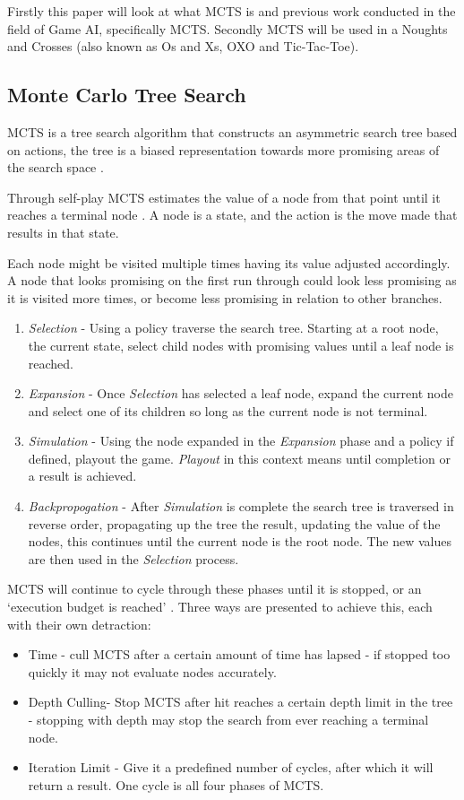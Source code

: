 \documentclass[conference]{IEEEtran}
\begin{document}
Firstly this paper will look at what MCTS is and previous work conducted in the field of Game AI, specifically MCTS. Secondly MCTS will be used in a Noughts and Crosses (also known as Os and Xs, OXO and Tic-Tac-Toe).

\subsection{Monte Carlo Tree Search}
MCTS is a tree search algorithm that constructs an asymmetric search tree based on actions, the tree is a biased representation towards more promising areas of the search space \cite{b5}.

Through self-play MCTS estimates the value of a node from that point until it reaches a terminal node \cite{b5}. A node is a state, and the action is the move made that results in that state.  

Each node might be visited multiple times having its value adjusted accordingly. A node that looks promising on the first run through could look less promising as it is visited more times, or become less promising in relation to other branches. 

\begin{enumerate}
  \item {\em Selection} - Using a policy traverse the search tree. Starting at a root node, the current state, select child nodes with promising values until a leaf node is reached.
  \item {\em Expansion} - Once {\em Selection} has selected a leaf node, expand the current node and select one of its children so long as the current node is not terminal.   
  \item {\em Simulation} - Using the node expanded in the {\em Expansion} phase and a policy if defined, playout the game. {\em Playout} in this context means until completion or a result is achieved.
  \item {\em Backpropogation} - After {\em Simulation} is complete the search tree is traversed in reverse order, propagating up the tree the result, updating the value of the nodes, this continues until the current node is the root node. The new values are then used in the {\em Selection} process.
\end{enumerate}

MCTS will continue to cycle through these phases until it is stopped, or an `execution budget is reached' \cite{b6}. Three ways are presented to achieve this, each with their own detraction:
\begin{itemize}
  \item Time - cull MCTS after a certain amount of time has lapsed - if stopped too quickly it may not evaluate nodes accurately.
  \item Depth Culling- Stop MCTS after hit reaches a certain depth limit in the tree - stopping with depth may stop the search from ever reaching a terminal node.
  \item Iteration Limit - Give it a predefined number of cycles, after which it will return a result. One cycle is all four phases of MCTS.
\end{itemize}
\end{document}
